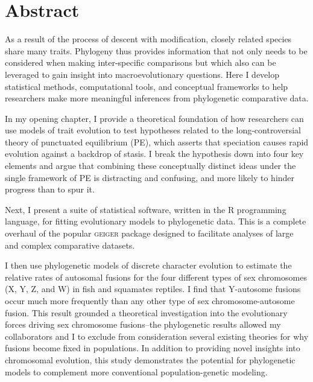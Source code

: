 \chapter*{Abstract}

As a result of the process of descent with modification, closely related species share many traits. Phylogeny thus provides information that not only needs to be considered when making inter-specific comparisons but which also can be leveraged to gain insight into macroevolutionary questions. Here I develop statistical methods, computational tools, and conceptual frameworks to help researchers make more meaningful inferences from phylogenetic comparative data. 

In my opening chapter, I provide a theoretical foundation of how researchers can use models of trait evolution to test hypotheses related to the long-controversial theory of punctuated equilibrium (PE), which asserts that speciation causes rapid evolution against a backdrop of stasis. I break the hypothesis down into four key elements and argue that combining these conceptually distinct ideas under the single framework of PE is distracting and confusing, and more likely to hinder progress than to spur it. 

Next, I present a suite of statistical software, written in the R programming language, for fitting evolutionary models to phylogenetic data. This is a complete overhaul of the popular \textsc{geiger} package designed to facilitate analyses of large and complex comparative datasets.

I then use phylogenetic models of discrete character evolution to estimate the relative rates of autosomal fusions for the four different types of sex chromosomes (X, Y, Z, and W) in fish and squamates reptiles. I find that Y-autosome fusions occur much more frequently than any other type of sex chromosome-autosome fusion. This result grounded a theoretical investigation into the evolutionary forces driving sex chromosome fusions--the phylogenetic results allowed my collaborators and I to exclude from consideration several existing theories for why fusions become fixed in populations. In addition to providing novel insights into chromosomal evolution, this study demonstrates the potential for phylogenetic models to complement more conventional population-genetic modeling.

